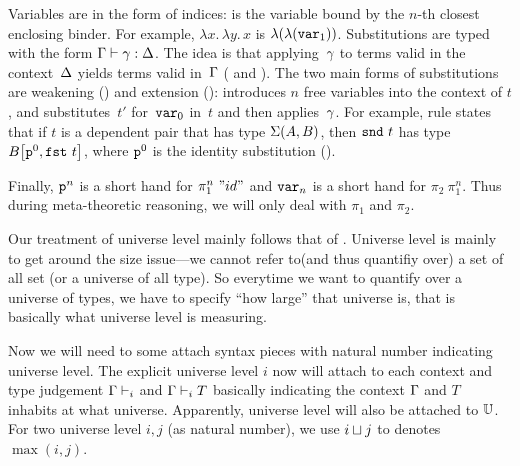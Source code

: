 Variables are in the form of \citeauthor{debruijn1964} indices:
 is the variable bound by the $n$-th closest enclosing binder.
For example, $\lambda x.\,\lambda y.\,x$ is $\lam{\lam{\var{1}}}$.
%
Substitutions are typed with the form 
$\goodSub{\Gm}{\gm}{\Dl}$.
The idea is that applying~$\gm$ to terms valid in the context~$\Dl$
yields terms valid in~$\Gm$ ( and ).
%
The two main forms of substitutions are weakening () and extension ():
 introduces $n$ free variables into the context of $t$, and
 substitutes~$t'$ for~$\var{0}$ in~$t$ and
then applies~$\gm$.
For example, rule  states that if $t$ is a dependent pair
that has type $\TySigma{A}{B}$, then $\snd{t}$ has type
$\sub{B}{\SubstExt{\SubstWeak{0}}{\fst{t}}}$,
where $\SubstId$ is the identity substitution ().

Finally, $\SubstWeak{n}$ is a short hand for $\pi_1^n~"id"$ and $\var{n}$ is a short hand for $\pi_2~\pi_1^{n}$. Thus during meta-theoretic reasoning, we will only deal with $\pi_1$ and $\pi_2$.

 Our treatment of universe level mainly follows that of \citet{altkap2016, kaposi2019gluing}. Universe level is mainly to get around the size issue---we cannot refer to(and thus quantifiy over) a set of all set (or a universe of all type). So everytime we want to quantify over a universe of types, we have to specify ``how large'' that universe is, that is basically what universe level is measuring. 





Now we will need to some attach syntax pieces with natural number indicating universe level. The explicit universe level $i$ now will attach to each context and type judgement $\goodCtx{\Gm}{i}$ and $\goodType{\Gm}{T}{i}$ basically indicating the context $\Gm$ and $T$ inhabits at what universe. Apparently, universe level will also be attached to $\cU$. For two universe level $i,j$ (as natural number), we use $i \lcup j$ to denotes $\max(i,j)$.


